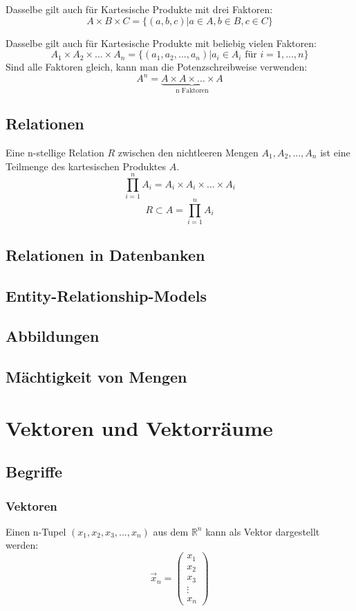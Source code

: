 Dasselbe gilt auch für Kartesische Produkte mit drei Faktoren:
\[ A \times B \times C = \{(a,b,c)|a \in A, b \in B, c \in C \}\]

Dasselbe gilt auch für Kartesische Produkte mit beliebig vielen Faktoren:
\[ A_1 \times A_2 \times ... \times A_n = \{(a_1,a_2,...,a_n)|a_i \in
A_i \text{ für } i = 1, ..., n \}\]
Sind alle Faktoren gleich, kann man die Potenzschreibweise verwenden:
\[ A^n = \underbrace{A \times A \times ... \times A}_{\text{n Faktoren}} \]

\subsection{Relationen}
Eine n-stellige Relation $R$ zwischen den nichtleeren Mengen $A_1, A_2,
..., A_n$ ist eine Teilmenge des kartesischen Produktes $A$.
\[ \prod \limits_{i=1}^{n}A_i = A_i \times A_i \times ...  \times A_i \]
\[ R \subset A = \prod \limits_{i=1}^{n}A_i \]

\subsection{Relationen in Datenbanken}
\subsection{Entity-Relationship-Models}
\subsection{Abbildungen}
\subsection{Mächtigkeit von Mengen}

\section{Vektoren und Vektorräume}

\subsection{Begriffe}
\subsubsection{Vektoren}
Einen n-Tupel $(x_1, x_2, x_3, ..., x_n)$ aus dem $\mathbb{R}^n$ kann
als Vektor dargestellt werden:
\[ \vec x_n = \left(
    \begin {array} {c}
        x_1 \\
        x_2 \\
        x_3 \\
        \vdots \\
        x_n
    \end {array}
  \right) \]

